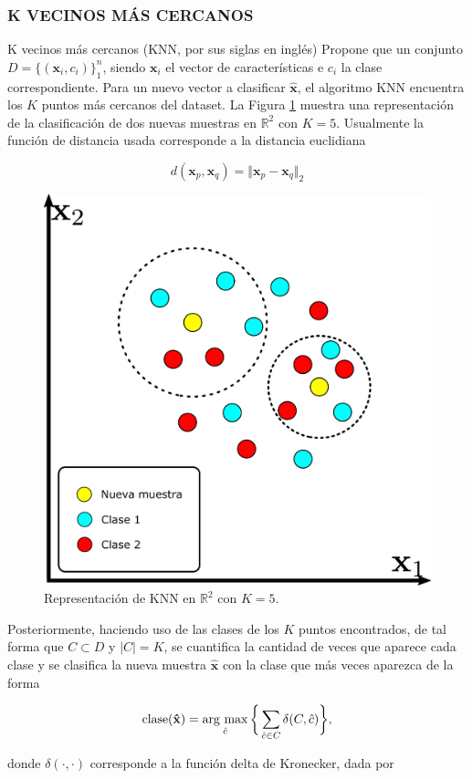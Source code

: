\subsubsection{K VECINOS MÁS CERCANOS}

K vecinos más cercanos (KNN, por sus siglas en inglés) Propone que un conjunto $D = \{(\mathbf{x}_i, c_i)\}_1^n$, siendo $\mathbf{x}_i$ el vector de características e $c_i$ la clase correspondiente. Para un nuevo vector a clasificar $\mathbf{\hat{x}}$, el algoritmo KNN encuentra los $K$ puntos más cercanos del dataset. La Figura \ref{fig:knn} muestra una representación de la clasificación de dos nuevas muestras en $\mathbb{R}^2$ con $K = 5$. Usualmente la función de distancia usada corresponde a la distancia euclidiana

\begin{equation}
    d(\mathbf{x}_p,\mathbf{x}_q) = \Vert \mathbf{x}_p-\mathbf{x}_q \Vert_2
    \label{eq:distancia_euclidiana}
\end{equation}

\begin{figure}[H]
    \centering
    \includegraphics[width=0.4\linewidth]{images/knn.pdf}
    \caption{\hspace{2mm}Representación de KNN en $\mathbb{R}^2$ con $K = 5$.}
    \label{fig:knn}
\end{figure}

Posteriormente, haciendo uso de las clases de los $K$ puntos encontrados, de tal forma que $C \subset D$ y $\vert C \vert = K$, se cuantifica la cantidad de veces que aparece cada clase y se clasifica la nueva muestra $\mathbf{\hat{x}}$ con la clase que más veces aparezca de la forma

\begin{equation}
    \mathrm{clase}(\mathbf{\hat{x}}) =  \operatorname*{arg \ max}_{\hat{c}} \bigg\{ \sum_{\hat{c} \in C} \delta(C,\hat{c})\bigg\},
\end{equation}

donde $\delta(\cdot,\cdot)$ corresponde a la función delta de Kronecker, dada por


